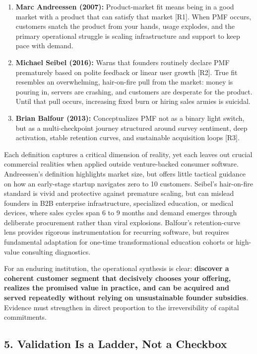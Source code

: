 \begin{enumerate}
    \item \textbf{Marc Andreessen (2007):} Product-market fit means being in a good market with a product that can satisfy that market [R1]. When PMF occurs, customers snatch the product from your hands, usage explodes, and the primary operational struggle is scaling infrastructure and support to keep pace with demand.
    \item \textbf{Michael Seibel (2016):} Warns that founders routinely declare PMF prematurely based on polite feedback or linear user growth [R2]. True fit resembles an overwhelming, hair-on-fire pull from the market: money is pouring in, servers are crashing, and customers are desperate for the product. Until that pull occurs, increasing fixed burn or hiring sales armies is suicidal.
    \item \textbf{Brian Balfour (2013):} Conceptualizes PMF not as a binary light switch, but as a multi-checkpoint journey structured around survey sentiment, deep activation, stable retention curves, and sustainable acquisition loops [R3].
\end{enumerate}

Each definition captures a critical dimension of reality, yet each leaves out crucial commercial realities when applied outside venture-backed consumer software. Andreessen's definition highlights market size, but offers little tactical guidance on how an early-stage startup navigates zero to 10 customers. Seibel's hair-on-fire standard is vivid and protective against premature scaling, but can mislead founders in B2B enterprise infrastructure, specialized education, or medical devices, where sales cycles span 6 to 9 months and demand emerges through deliberate procurement rather than viral explosions. Balfour's retention-curve lens provides rigorous instrumentation for recurring software, but requires fundamental adaptation for one-time transformational education cohorts or high-value consulting diagnostics.

For an enduring institution, the operational synthesis is clear: \textbf{discover a coherent customer segment that decisively chooses your offering, realizes the promised value in practice, and can be acquired and served repeatedly without relying on unsustainable founder subsidies}. Evidence must strengthen in direct proportion to the irreversibility of capital commitments.

\subsection*{5. Validation Is a Ladder, Not a Checkbox}

